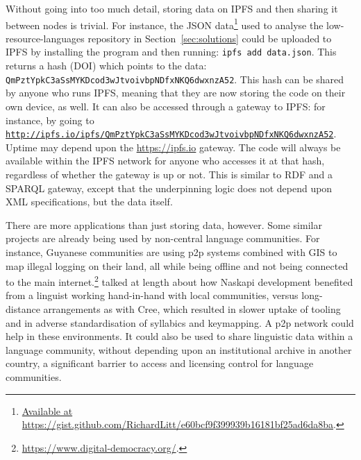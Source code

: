 Without going into too much detail, storing data on IPFS and then sharing it between nodes is trivial. For instance, the JSON data\footnote{\href{https://gist.github.com/RichardLitt/e60bcf9f399939b16181bf25ad6da8ba}{Available at https://gist.github.com/RichardLitt/e60bcf9f399939b16181bf25ad6da8ba}. } used to analyse the low-resource-languages repository in Section~\ref{sec:solutions} could be uploaded to IPFS by installing the program and then running: {\tt ipfs add data.json}. This returns a hash (DOI) which points to the data: {\tt QmPztYpkC3aSs\-MYKDcod\-3wJtvoivbp\-NDfxNKQ6dwxnzA52}. This hash can be shared by anyone who runs IPFS, meaning that they are now storing the code on their own device, as well. It can also be accessed through a gateway to IPFS: for instance, by going to \href{http://ipfs.io/ipfs/QmPztYpkC3aSsMYKDcod3wJtvoivbpNDfxNKQ6dwxnzA52}{\nolinkurl{http://ipfs.io/ipfs/QmPztYpkC3aSsMYKDcod3wJtvoivbpNDfxNKQ6dwxnzA52}}. Uptime may depend upon the \href{https://ipfs.io}{https://ipfs.io} gateway. The code will always be available within the IPFS network for anyone who accesses it at that hash, regardless of whether the gateway is up or not. This is similar to RDF and a SPARQL gateway, except that the underpinning logic does not depend upon XML specifications, but the data itself.

There are more applications than just storing data, however. Some similar projects are already being used by non-central language communities. For instance, Guyanese communities are using p2p systems combined with GIS to map illegal logging on their land, all while being offline and not being connected to the main internet.\footnote{\href{https://www.digital-democracy.org/}{https://www.digital-democracy.org/}. } \citet[90]{jancewicz2002applied} talked at length about how Naskapi development benefited from a linguist working hand-in-hand with local communities, versus long-distance arrangements as with Cree, which resulted in slower uptake of tooling and in adverse standardisation of syllabics and keymapping. A p2p network could help in these environments. It could also be used to share linguistic data within a language community, without depending upon an institutional archive in another country, a significant barrier to access and licensing control for language communities.
